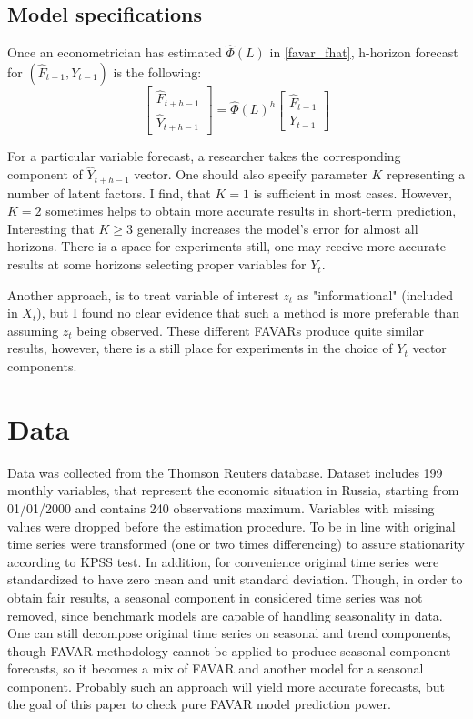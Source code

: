 \documentclass[a4paper, 14pt]{article}
\begin{document}
\subsection{Model specifications}
Once an econometrician has estimated $\hat\Phi(L)$ in \eqref{favar_fhat}, h-horizon forecast for $(\hat{F}_{t-1}, Y_{t-1})$ is the following:
\[\begin{bmatrix}
\hat{F}_{t+h-1} \\
\hat{Y}_{t+h-1}
\end{bmatrix} = \hat\Phi (L) ^{h}
\begin{bmatrix}
\hat{F}_{t-1} \\
Y_{t-1}
\end{bmatrix}\]

For a particular variable forecast, a researcher takes the corresponding component of $\hat{Y}_{t+h-1}$ vector. One should also specify parameter $K$ representing a number of latent factors. I find, that $K=1$ is sufficient in most cases. However, $K=2$ sometimes helps to obtain more accurate results in short-term prediction, Interesting that $K\ge 3$ generally increases the model's error for almost all horizons. There is a space for experiments still, one may receive more accurate results at some horizons selecting proper variables for $Y_t$.

Another approach, is to treat variable of interest $z_t$ as "informational" (included in $X_t$), but I found no clear evidence that such a method is more preferable than assuming $z_t$ being observed. These different FAVARs produce quite similar results, however, there is a still place for experiments in the choice of $Y_t$ vector components. 

\section{Data}

Data was collected from the Thomson Reuters database. Dataset includes 199 monthly variables, that represent the economic situation in Russia, starting from 01/01/2000 and contains 240 observations maximum. Variables with missing values were dropped before the estimation procedure. To be in line with \cite{bernanke2005measuring} original time series were transformed (one or two times differencing) to assure stationarity according to KPSS test. In addition, for convenience original time series were standardized to have zero mean and unit standard deviation. Though, in order to obtain fair results, a seasonal component in considered time series was not removed, since benchmark models are capable of handling seasonality in data. One can still decompose original time series on seasonal and trend components, though FAVAR methodology cannot be applied to produce seasonal component forecasts, so it becomes a mix of FAVAR and another model for a seasonal component. Probably such an approach will yield more accurate forecasts, but the goal of this paper to check pure FAVAR model prediction power.
\end{document}

